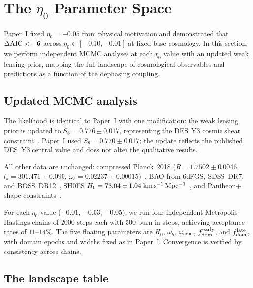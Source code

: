 \documentclass[aps,prd,twocolumn,superscriptaddress,nofootinbib]{revtex4-2}
\newcommand{\fdom}{f_{\rm dom}}
\newcommand{\dAIC}{\Delta{\rm AIC}}
\begin{document}
\section{The $\eta_0$ Parameter Space}
\label{sec:eta_space}

Paper~I fixed $\eta_0 = -0.05$ from physical motivation and
demonstrated that $\dAIC < -6$ across $\eta_0 \in [-0.10, -0.01]$
at fixed base cosmology. In this section, we perform independent
MCMC analyses at each $\eta_0$ value with an updated weak lensing
prior, mapping the full landscape of cosmological observables and
predictions as a function of the dephasing coupling.

\subsection{Updated MCMC analysis}
\label{sec:mcmc}

The likelihood is identical to Paper~I with one modification: the
weak lensing prior is updated to $S_8 = 0.776 \pm 0.017$,
representing the DES~Y3 cosmic shear constraint~\cite{DES2022}.
Paper~I used $S_8 = 0.770 \pm 0.017$; the update reflects the
published DES~Y3 central value and does not alter the qualitative
results.

All other data are unchanged: compressed Planck~2018
($R = 1.7502 \pm 0.0046$, $l_a = 301.471 \pm 0.090$,
$\omega_b = 0.02237 \pm 0.00015$)~\cite{Planck2018,Efstathiou2019},
BAO from 6dFGS, SDSS~DR7, and BOSS~DR12~\cite{Beutler2011,Ross2015,BOSS2017},
SH0ES $H_0 = 73.04 \pm 1.04\;{\rm km\,s^{-1}\,
Mpc^{-1}}$~\cite{Riess2022}, and Pantheon+ shape
constraints~\cite{Pantheon2022}.

For each $\eta_0$ value ($-0.01$, $-0.03$, $-0.05$), we run four
independent Metropolis-Hastings chains of $2000$ steps each with
$500$ burn-in steps, achieving acceptance rates of $11$--$14\%$.
The five floating parameters are $H_0$, $\omega_b$,
$\omega_{\rm cdm}$, $\fdom^{\rm early}$, and $\fdom^{\rm late}$,
with domain epochs and widths fixed as in Paper~I. Convergence is
verified by consistency across chains.

\subsection{The landscape table}
\label{sec:landscape}
\end{document}
